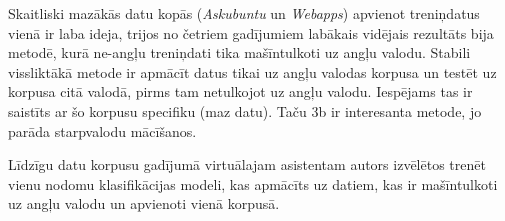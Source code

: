 Skaitliski mazākās datu kopās (\textit{Askubuntu} un \textit{Webapps}) apvienot treniņdatus vienā ir laba ideja, trijos no četriem gadījumiem labākais vidējais rezultāts bija metodē, kurā ne-angļu treniņdati tika mašīntulkoti uz angļu valodu. Stabili vissliktākā metode ir apmācīt datus tikai uz angļu valodas korpusa un testēt uz korpusa citā valodā, pirms tam netulkojot uz angļu valodu. Iespējams tas ir saistīts ar šo korpusu specifiku (maz datu). Taču 3b ir interesanta metode, jo parāda starpvalodu mācīšanos. 

Līdzīgu datu korpusu gadījumā virtuālajam asistentam autors izvēlētos trenēt vienu nodomu klasifikācijas modeli, kas apmācīts uz datiem, kas ir mašīntulkoti uz angļu valodu un apvienoti vienā korpusā.









